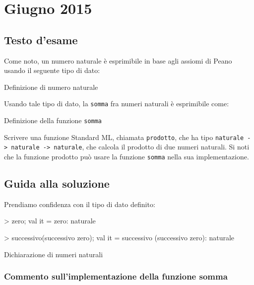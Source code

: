 \section{Giugno 2015}

\subsection{Testo d'esame}

Come noto, un numero naturale è esprimibile in base agli assiomi di Peano usando il seguente tipo di dato:

\begin{listing}[!h]
\caption[Tipo di dato \texttt{naturale}]{Definizione di numero naturale}
\end{listing}

Usando tale tipo di dato, la \texttt{somma} fra numeri naturali è esprimibile come:

\begin{listing}[!h]
\caption[Funzione \texttt{somma}]{Definizione della funzione \texttt{somma}}
\end{listing}

Scrivere una funzione Standard ML, chiamata \texttt{prodotto}, che ha tipo \texttt{naturale -> naturale -> naturale}, che calcola il prodotto di due numeri naturali. Si noti che la funzione prodotto può usare la funzione \texttt{somma} nella sua implementazione.

\subsection{Guida alla soluzione}

Prendiamo confidenza con il tipo di dato definito:

\begin{listing}[!h]
\begin{smlcode}
> zero;
val it = zero: naturale

> successivo(successivo zero);
val it = successivo (successivo zero): naturale
\end{smlcode}
\caption[]{Dichiarazione di numeri naturali}
\end{listing}

\subsubsection*{Commento sull'implementazione della funzione somma}

